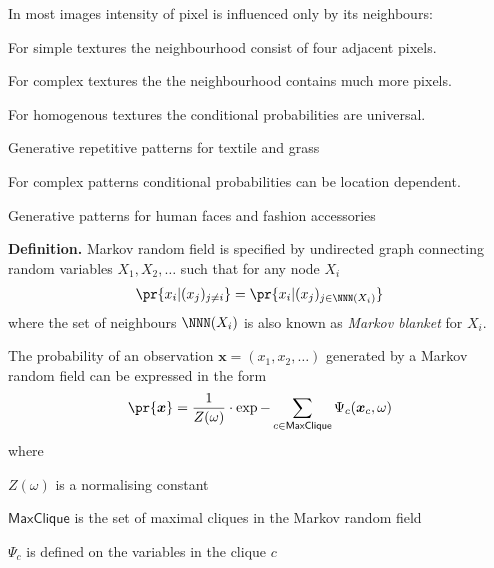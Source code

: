 \documentclass[landscape,footrule]{foils}
\renewcommand{\vec}[1]{\boldsymbol{#1}}
\begin{document}
In most images intensity of pixel is influenced only by its neighbours:
\begin{triangles}
\item For simple textures the neighbourhood consist of four adjacent pixels.
\item For complex textures the the neighbourhood contains much more pixels.
\item For homogenous textures the conditional probabilities are universal\vspace*{0.5ex}.
\begin{diamonds}
\item Generative repetitive patterns for textile and grass\vspace*{1ex}   
\end{diamonds}

\item For complex patterns conditional probabilities can be location dependent.\vspace*{0.5ex}

\begin{diamonds}
\item Generative patterns for human faces and fashion accessories 
\end{diamonds}
\end{triangles}



\textbf{Definition.}
Markov random field is specified by undirected graph connecting random variables $X_1,X_2,\ldots$ such that for any node $X_i$ 
\begin{align*}
\pr{x_i|(x_j)_{j\neq i}}=\pr{x_i| (x_j)_{j\in\NNN(X_i)} }
\end{align*}
where the set of neighbours $\NNN(X_i)$ is also known as \emph{Markov blanket} for $X_i$. 



The probability of an observation $\vec{x}=(x_1,x_2,\ldots)$ generated by a Markov random field can be expressed in the form 
\begin{align*}
\pr{\vec{x}}=\frac{1}{Z(\omega)}\cdot\exp{-\sum_{c\in\textsf{MaxClique}}\Psi_c(\vec{x}_c,\omega)} 
\end{align*}  
where
\begin{triangles}
\item $Z(\omega)$ is a normalising constant
\item $\textsf{MaxClique}$ is the set of maximal cliques in the Markov random field
\item $\Psi_c$ is defined on the variables in the clique $c$ 
\end{triangles}
\vspace*{2ex}
\end{document}
